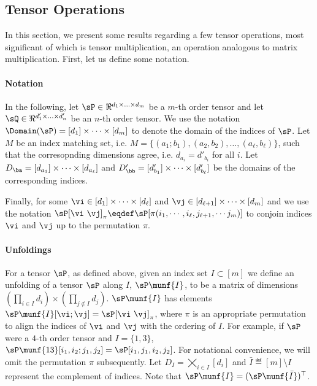 \subsection{Tensor Operations}
\label{app:tensor-multiplication}

In this section, we present some results regarding a few tensor
operations, most significant of which is tensor multiplication, an
operation analogous to matrix multiplication.  
First, let us define some notation.

\paragraph{Notation}
In the following, let $\sP \in \Re^{d_1 \times \ldots \times d_m}$ be
  a $m$-th order tensor and let $\sQ \in \Re^{d'_1 \times \ldots \times
  d'_n}$ be an $n$-th order tensor. %
We use the notation $\Domain(\sP) = [d_1] \times \cdots \times [d_m]$
  to denote the domain of the indices of $\sP$.
Let $M$ be an index matching set, i.e. $M = \{ (a_1; b_1),
  (a_2, b_2), \ldots, (a_\ell, b_\ell) \}$, such that the corresopnding
  dimensions agree, i.e. $d_{a_i} = d'_{b_i}$ for all $i$. Let $D_{\ba}
  = [d_{a_1}] \times \cdots \times [d_{a_\ell}]$ and $D'_{\bb}
  = [d'_{b_1}] \times \cdots \times [d'_{b_\ell}]$ be the domains of the
  corresponding indices.

Finally, for some $\vi \in [d_1] \times \cdots \times [d_\ell]$ and $\vj
\in [d_{\ell + 1}] \times \cdots \times [d_m]$ and  we use the notation
$\sP[\vi \ \vj]_\pi \eqdef \sP[\pi(i_1, \cdots, i_\ell, j_{\ell+1},
\cdots j_m)]$ to conjoin indices $\vi$ and $\vj$ up to the permutation
$\pi$. 

\paragraph{Unfoldings}
For a tensor $\sP$, as defined above, 
  given an index set $I \subset [m]$ we
  define an unfolding of a tensor $\sP$ along $I$,
 $\sP\munf{I}$, to be a matrix of dimensions $(\prod_{i \in I} d_i)
 \times (\prod_{j \not\in I} d_j)$. $\sP\munf{I}$ has elements
 $\sP\munf{I}[\vi;\vj] = \sP[\vi\ \vj]_{\pi}$, where $\pi$ is an
 appropriate permutation to align the indices of $\vi$ and $\vj$ with
 the ordering of $I$. 
For example, if $\sP$ were a $4$-th order tensor and $I = \{1,3\}$,
  $\sP\munf{13}[i_1,i_2; j_1,j_2] = \sP[i_1,j_1,i_2,j_2]$.
For notational convenience, we will omit the permutation $\pi$ subsequently.
Let $D_I = \bigtimes_{i \in I} [d_i]$ and  $\bar I \eqdef [m] \setminus
  I$ represent the complement of indices. Note that $\sP\munf{I}
  = (\sP\munf{\bar I})^\top$.

